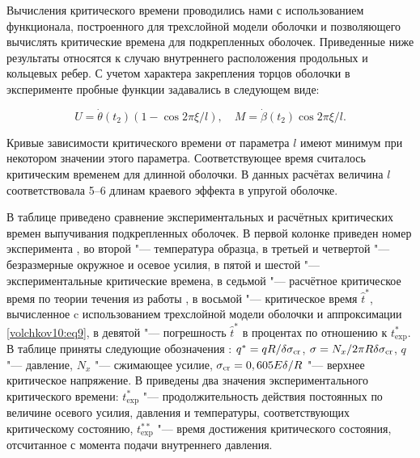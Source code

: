 %




Вычисления критического времени проводились нами с использованием функционала,
построенного для трехслойной модели оболочки \cite{volchkov:V3} и позволяющего вычислять
критические времена для подкрепленных оболочек. Приведенные ниже результаты относятся к
случаю внутреннего расположения продольных и кольцевых ребер. С учетом характера
закрепления торцов оболочки в эксперименте пробные функции задавались в следующем виде:

\begin{equation}
\label{volchkov10:eq9}
U=\dot \theta(t_2)(1-\cos{2\pi\xi/l} ), \quad M=\dot \beta(t_2) \cos{2\pi\xi/l}.
\end{equation}

Кривые зависимости критического времени от параметра $l$ имеют минимум при некотором
значении этого параметра. Соответствующее время считалось критическим временем для
длинной оболочки. В данных расчётах величина $l$ соответствовала 5--6 длинам краевого
эффекта в упругой оболочке.




В таблице приведено сравнение экспериментальных и расчётных критических времен
выпучивания подкрепленных оболочек.
В первой колонке приведен номер эксперимента \cite{Kurshin:K1} , во второй "---
температура образца, в третьей и четвертой "--- безразмерные окружное и осевое усилия, в
пятой и шестой "--- экспериментальные критические времена, в седьмой "--- расчётное
критическое время по теории течения из работы  \cite{Poshivalov:Posh1}, в восьмой "---
критическое время $\hat{t}^\ast$, вычисленное c использованием трехслойной модели
оболочки и аппроксимации \eqref{volchkov10:eq9}, в девятой
"--- погрешность $\hat{t}^\ast$ в процентах по отношению к $t^\ast_{\exp}$. 
В таблице приняты следующие обозначения \cite{Kurshin:K1}: $q^\ast=qR/\delta
\sigma_{\rm cr}$, $\sigma=N_x/2\pi R\delta\sigma_{\rm cr}$, $q$ "--- давление, $N_x$ "--- сжимающее усилие, $\sigma_{\rm cr}=0,605 E\delta/R$ "--- верхнее
критическое напряжение. В \cite{Kurshin:K1} приведены два значения экспериментального
критического времени: $t^\ast_{\exp}$ "--- продолжительность действия постоянных по
величине осевого усилия, давления и температуры, соответствующих критическому состоянию,
$t^{\ast\ast}_{\exp}$ "--- время достижения критического состояния, отсчитанное с момента
подачи внутреннего давления.


